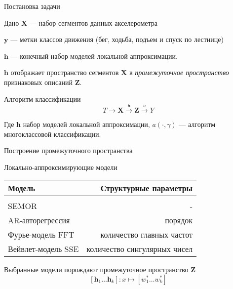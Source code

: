\documentclass{beamer}
\newcommand{\by}{\mathbf{y}}
\newcommand{\bX}{\mathbf{X}}
\newcommand{\bh}{\mathbf{h}}
\newcommand{\bZ}{\mathbf{Z}}
\begin{document}
\begin{frame}{Постановка задачи}
    \begin{block}{Дано}
        $\bX$ — набор сегментов данных акселерометра

        $\by$ — метки классов движения (бег, ходьба, подъем и спуск по лестнице)

        $\bh$ — конечный набор моделей локальной аппроксимации.
    \end{block}
    $\bh$ отображает пространство сегментов $\bX$ в
    \textit{промежуточное пространство} признаковых описаний $\bZ$.
    \begin{block}{Алгоритм классификации}
        $$
        T \rightarrow \bX \xrightarrow{\bh} \bZ \xrightarrow{a} Y
        $$

        Где $\bh$ набор моделей локальной аппроксимации, $a(\cdot, \gamma)$ —
        алгоритм многоклассовой классификации.
    \end{block}
\end{frame}



\begin{frame}{Построение промежуточного пространства}
    \begin{block}{Локально-аппроксимирующие модели}
    \begin{center}
        \begin{tabular}{| l | r |}
            Модель & Структурные параметры \\
            \hline \\
            SEMOR & - \\
            AR-авторегрессия & порядок \\
            Фурье-модель FFT & количество главных частот \\
            Вейвлет-модель SSE & количество сингулярных чисел\\
            \hline
            \end{tabular}
    \end{center}
    \end{block}

    Выбранные модели порождают промежуточное пространство $\bZ$
    $$
    [\bh_1\ldots \bh_k]: x \mapsto [w_1^* \ldots w_k^*]
    $$
\end{frame}

\end{document}
